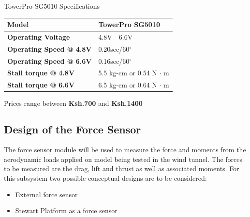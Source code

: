 \begin{table}[!h]
\caption[Motor Specifications]{TowerPro SG5010 Specifications}
\end{table}
\begin{center}
\begin{tabular}{|l|l|}
\hline
\textbf{Model}& TowerPro SG5010\\
\hline
\textbf{Operating Voltage} & 4.8V - 6.6V\\
\hline
\textbf{Operating Speed @ 4.8V} & 0.20sec/60$^{\circ}$\\
\hline
\textbf{Operating Speed @ 6.6V}& 0.16sec/60$^{\circ}$\\
\hline
\textbf{Stall torque @ 4.8V} & 5.5 kg-cm or 0.54 N $\cdot$ m\\
\hline
\textbf{Stall torque @ 6.6V} & 6.5 kg-cm or 0.64 N $\cdot$ m\\
\hline
\end{tabular}
\end{center}
Prices range between \textbf{Ksh.700} and \textbf{Ksh.1400}

\subsection{Design of the Force Sensor}
The force sensor module will be used to measure the force and moments from the aerodynamic loads applied on model being tested in the wind tunnel. The forces to be measured are the drag, lift and thrust as well as associated moments. For this subsystem two possible conceptual designs are to be considered:
\begin{itemize}
\item External force sensor
\item Stewart Platform as a force sensor
\end{itemize}
